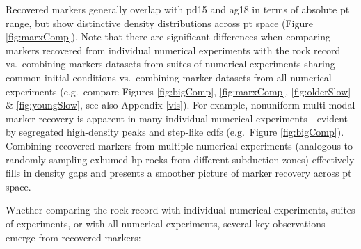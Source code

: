 Recovered markers generally overlap with pd15 and ag18 in terms of absolute \gls{pt} range, but show distinctive density distributions across \gls{pt} space (Figure \ref{fig:marxComp}). Note that there are significant differences when comparing markers recovered from individual numerical experiments with the rock record vs.~combining markers datasets from suites of numerical experiments sharing common initial conditions vs.~combining marker datasets from all numerical experiments (e.g.~compare Figures \ref{fig:bigComp}, \ref{fig:marxComp}, \ref{fig:olderSlow} \& \ref{fig:youngSlow}, see also Appendix \ref{vis}). For example, nonuniform multi-modal marker recovery is apparent in many individual numerical experiments---evident by segregated high-density peaks and step-like \glspl{cdf} (e.g.~Figure \ref{fig:bigComp}). Combining recovered markers from multiple numerical experiments (analogous to randomly sampling exhumed \gls{hp} rocks from different subduction zones) effectively fills in density gaps and presents a smoother picture of marker recovery across \gls{pt} space.

Whether comparing the rock record with individual numerical experiments, suites of experiments, or with all numerical experiments, several key observations emerge from recovered markers:

\pagebreak

